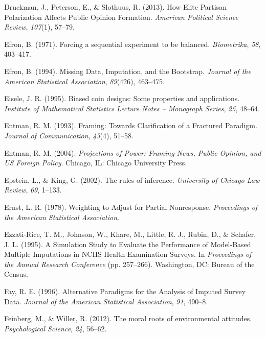 \documentclass[12pt,econ]{sources/authesis}
\begin{document}
\leavevmode\hypertarget{ref-druckman_how_2013}{}%
Druckman, J., Peterson, E., \& Slothuus, R. (2013). How Elite Partisan Polarization Affects Public Opinion Formation. \emph{American Political Science Review}, \emph{107}(1), 57--79.

\leavevmode\hypertarget{ref-efron_1971_forcing}{}%
Efron, B. (1971). Forcing a sequential experiment to be balanced. \emph{Biometrika}, \emph{58}, 403--417.

\leavevmode\hypertarget{ref-efron_1994_missing}{}%
Efron, B. (1994). Missing Data, Imputation, and the Bootstrap. \emph{Journal of the American Statistical Association}, \emph{89}(426), 463--475.

\leavevmode\hypertarget{ref-eisele_1995_biased}{}%
Eisele, J. R. (1995). Biased coin designs: Some properties and applications. \emph{Institute of Mathematical Statistics Lecture Notes -- Monograph Series}, \emph{25}, 48--64.

\leavevmode\hypertarget{ref-entman_framing_1993}{}%
Entman, R. M. (1993). Framing: Towards Clarification of a Fractured Paradigm. \emph{Journal of Communication}, \emph{43}(4), 51--58.

\leavevmode\hypertarget{ref-entman_projections_2004}{}%
Entman, R. M. (2004). \emph{Projections of Power: Framing News, Public Opinion, and US Foreign Policy}. Chicago, IL: Chicago University Press.

\leavevmode\hypertarget{ref-epstein_2002_rules}{}%
Epstein, L., \& King, G. (2002). The rules of inference. \emph{University of Chicago Law Review}, \emph{69}, 1--133.

\leavevmode\hypertarget{ref-ernst_1978_weighting}{}%
Ernst, L. R. (1978). Weighting to Adjust for Partial Nonresponse. \emph{Proceedings of the American Statistical Association}.

\leavevmode\hypertarget{ref-ezzati-rice_1995_simulation}{}%
Ezzati-Rice, T. M., Johnson, W., Khare, M., Little, R. J., Rubin, D., \& Schafer, J. L. (1995). A Simulation Study to Evaluate the Performance of Model-Based Multiple Imputations in NCHS Health Examination Surveys. In \emph{Proceedings of the Annual Research Conference} (pp. 257--266). Washington, DC: Bureau of the Census.

\leavevmode\hypertarget{ref-fay_1996_alternative}{}%
Fay, R. E. (1996). Alternative Paradigms for the Analysis of Imputed Survey Data. \emph{Journal of the American Statistical Association}, \emph{91}, 490--8.

\leavevmode\hypertarget{ref-feinberg_2012_moral}{}%
Feinberg, M., \& Willer, R. (2012). The moral roots of environmental attitudes. \emph{Psychological Science}, \emph{24}, 56--62.
\end{document}
